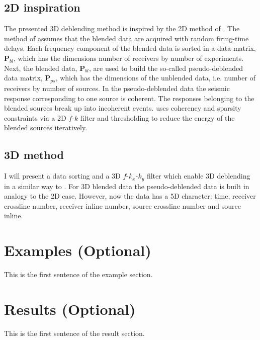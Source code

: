 \documentclass{madrid15WS}
\begin{document}
\subsection{2D inspiration}

The presented 3D deblending method is inspired by the 2D method of \citet{Mahdad-Deblending-Method}. The method of \citet{Mahdad-Deblending-Method} assumes that the blended data are acquired with random firing-time delays. Each frequency component of the blended data is sorted in a data matrix, $\mathbf{P}_{bl}$, which has the dimensions number of receivers by number of experiments. Next, the blended data, $\mathbf{P}_{bl}$, are used to build the so-called pseudo-deblended data matrix, $\mathbf{P}_{ps}$, which has the dimensions of the unblended data, i.e. number of receivers by number of sources. In the pseudo-deblended data the seismic response corresponding to one source is coherent. The responses belonging to the blended sources break up into incoherent events. \citet{Mahdad-Deblending-Method} uses coherency and sparsity constraints via a 2D $f$-$k$ filter and thresholding to reduce the energy of the blended sources iteratively. 

\subsection{3D method}  

I will present a data sorting and a 3D $f$-$k_x$-$k_y$ filter which enable 3D deblending in a similar way to \citet{Mahdad-Deblending-Method}. For 3D blended data the pseudo-deblended data is built in analogy to the 2D case. However, now the data has a 5D character: time, receiver crossline number, receiver inline number, source crossline number and source inline. 




\section{Examples (Optional)}

This is the first sentence of the example section.

\section{Results (Optional)}

This is the first sentence of the result section.

\end{document}
